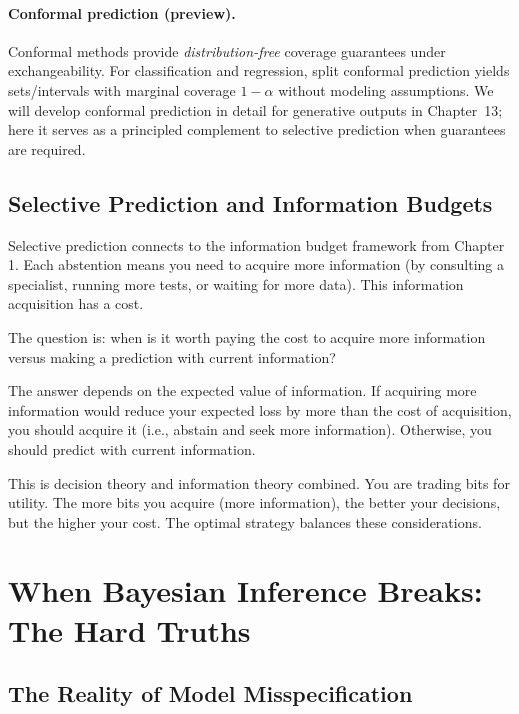 \paragraph{Conformal prediction (preview).} Conformal methods provide \emph{distribution-free} coverage guarantees under exchangeability. For classification and regression, split conformal prediction yields sets/intervals with marginal coverage $1-\alpha$ without modeling assumptions. We will develop conformal prediction in detail for generative outputs in Chapter~13; here it serves as a principled complement to selective prediction when guarantees are required.

\subsection{Selective Prediction and Information Budgets}

Selective prediction connects to the information budget framework from Chapter 1. Each abstention means you need to acquire more information (by consulting a specialist, running more tests, or waiting for more data). This information acquisition has a cost.

The question is: when is it worth paying the cost to acquire more information versus making a prediction with current information?

The answer depends on the expected value of information. If acquiring more information would reduce your expected loss by more than the cost of acquisition, you should acquire it (i.e., abstain and seek more information). Otherwise, you should predict with current information.

This is decision theory and information theory combined. You are trading bits for utility. The more bits you acquire (more information), the better your decisions, but the higher your cost. The optimal strategy balances these considerations.

\vspace{2em}

\section{When Bayesian Inference Breaks: The Hard Truths}

\subsection{The Reality of Model Misspecification}

